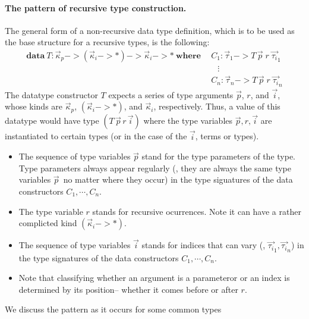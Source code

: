 \paragraph{The pattern of recursive type construction.}
The general form of a non-recursive data type definition, which is to be used
as the base structure for a recursive types, is the following:
\begin{align*}
\textbf{data}~ T : \vec{\kappa}_p -> (\vec{\kappa}_i -> *) ->
                                      \vec{\kappa}_i -> *
~\textbf{where}~
&~ C_1 : \vec{\tau}_1 -> T\,\vec{p}\;r\;\vec{\tau_i}_{1} \\
&\quad \vdots \\
&~ C_n : \vec{\tau}_n -> T\,\vec{p}\;r\;\vec{\tau_i}_{n}
\end{align*}
The datatype constructor $T$ expects a series of type arguments $\vec{p}$, $r$,
and $\vec{i}$, whose kinds are $\vec{\kappa}_p$, $(\vec{\kappa}_i -> *)$, and
$\vec{\kappa}_i$, respectively. Thus, a value of this datatype would have
type $(T\,\vec{p}\,r\,\vec{i})$ where the type variables $\vec{p},r,\vec{i}$
are instantiated to certain types (or in the case of the $\vec{i}$, terms or types).
\begin{itemize}
\item The sequence of type variables $\vec{p}$ stand for the type parameters of the
type. Type parameters always appear regularly 
(\ie, they are always the same type variables $\vec{p}$\
no matter where they occur) in the type siguatures of
the data constructors $C_1,\cdots,C_n$. 

\item The type variable $r$ stands for
recursive ocurrences. Note it can have a rather complicted kind $(\vec{\kappa}_i -> *)$.

\item The sequence of type variables $\vec{i}$ stands for indices
that can vary (\eg, $\vec{\tau_i}_1,\vec{\tau_i}_n$) in the type signatures of
the data constructors $C_1,\cdots,C_n$. 

\item Note that classifying whether an argument is a parameteror or an index is
determined by its position-- whether it comes before or after $r$.

\end{itemize}
We discuss the pattern as it occurs for some common types
